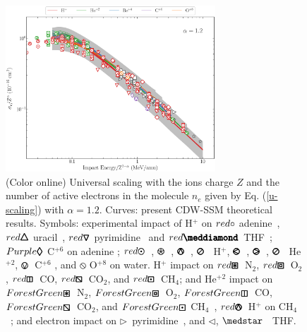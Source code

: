 \documentclass[10pt,showpacs,showkeys,twocolumn]{revtex4-1}
\begin{document}
\begin{figure}[!t]%
\centering
\includegraphics[width=0.7\textwidth]{zmol_werror.eps}
\caption{(Color online) Universal scaling with the ions charge $Z$ and 
the number of active electrons in the molecule $n_e$ given by Eq. 
(\ref{u-scaling}) with $\alpha=1.2$. Curves: present CDW-SSM theoretical 
results. Symbols: experimental impact of H$^+$ on 
\mbox{\LARGE$\color{red}\circ$} adenine~\cite{iriki2011}, 
{\fontsize{11}{20}$\color{red}\pmb{\triangle}$} uracil~\cite{itoh2013}, 
{\fontsize{11}{20}$\color{red}\pmb{\triangledown}$} pyrimidine~\cite{wolff2014} and 
{\fontsize{10}{20}$\color{red}\pmb{\meddiamond}$} THF~\cite{wang2016};
{\fontsize{11}{20}$\color{Purple}\pmb{\lozenge}$} C$^{+6}$ on adenine \cite{tribedi2019};
\mbox{\fontsize{11}{20}$\color{red}\pmb{\odot}$}~\cite{Luna2007}, 
{\fontsize{11}{20}\color{red}$\pmb{\logof}$}~\cite{Rudd86}, 
{\fontsize{11}{20}\color{red}$\pmb{\varowedge}$}~\cite{pRudd85}, 
{\fontsize{11}{20}\color{red}$\pmb{\varoslash}$}~\cite{toburen80} H$^+$,
{\fontsize{11}{20}\color{ForestGreen}$\pmb{\varolessthan}$}~\cite{Ohsawa05},
{\fontsize{11}{20}\color{ForestGreen}$\pmb{\varogreaterthan}$}~\cite{Rudd85},
{\fontsize{11}{20}\color{ForestGreen}$\pmb{\varoslash}$}~\cite{toburen80} He$^{+2}$,
{\fontsize{11}{20}\color{Purple}$\pmb{\ovee}$}~C$^{+6}$ \cite{DalCappello2009,Bhattacharjee17}, and 
{\fontsize{11}{20}\color{BurntOrange}$\pmb{\obslash}$}
O$^{+8}$ \cite{Tribedi_O_water} on water.
H$^{+}$ impact on 
{\fontsize{11}{20}${\color{red}\pmb{\boxast}}$}~N$_2$, 
{\fontsize{11}{20}${\color{red}\pmb{\boxbox}}$}~O$_2$, 
{\fontsize{11}{20}${\color{red}\pmb{\boxbar}}$}~CO, 
{\fontsize{11}{20}${\color{red}\pmb{\boxbslash}}$}~CO$_2$, and
{\fontsize{11}{20}${\color{red}\pmb{\boxdot}}$}~CH$_4$; 
and He$^{+2}$ impact on 
{\fontsize{11}{20}${\color{ForestGreen}\pmb{\boxast}}$}~N$_2$,
{\fontsize{11}{20}${\color{ForestGreen}\pmb{\boxbox}}$}~O$_2$, 
{\fontsize{11}{20}${\color{ForestGreen}\pmb{\boxbar}}$}~CO, 
{\fontsize{11}{20}${\color{ForestGreen}\pmb{\boxbslash}}$}~CO$_2$, and
{\fontsize{11}{20}${\color{ForestGreen}\pmb{\boxdot}}$} 
CH$_4$~\cite{Rudd85,Rudd1983}, 
{\fontsize{11}{20}${\color{red}\pmb{\varowedge}}$}~H$^{+}$ on 
CH$_4$~\cite{Luna2019}; 
and electron impact on $\rhd$~pyrimidine~\cite{bug2017}, and $\lhd$, 
$\medstar$~\cite{wolf2019,fuss2009} THF.}
\label{fig:zalpha}
\end{figure} 
 
\end{document}
